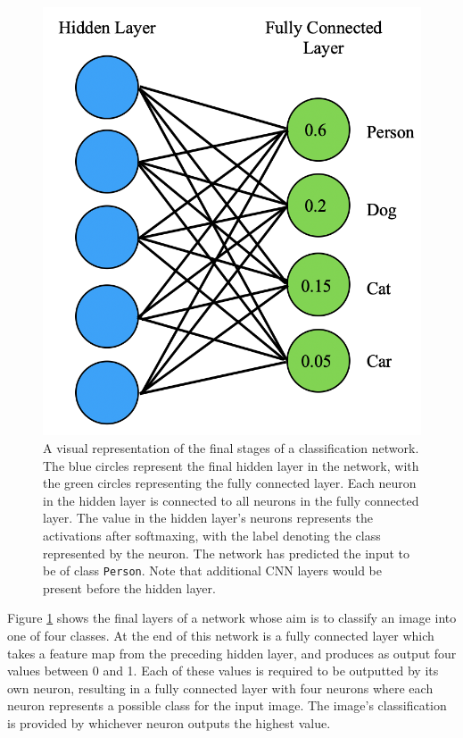 \begin{figure}[!hb]
	\begin{center}
		\includegraphics[scale=0.45]{Chapter2/figs/fully-connected.png}
	\end{center}
	\caption[A visual representation of the final stages of a classification network.]{A visual representation of the final stages of a classification network. The blue circles represent the final hidden layer in the network, with the green circles representing the fully connected layer. Each neuron in the hidden layer is connected to all neurons in the fully connected layer. The value in the hidden layer's neurons represents the activations after softmaxing, with the label denoting the class represented by the neuron. The network has predicted the input to be of class \texttt{Person}. Note that additional CNN layers would be present before the hidden layer.}
	\label{fig:fully-connected}
\end{figure}

Figure \ref{fig:fully-connected} shows the final layers of a network whose aim is to classify an image into one of four classes. At the end of this network is a fully connected layer which takes a feature map from the preceding hidden layer, and produces as output four values between 0 and 1. Each of these values is required to be outputted by its own neuron, resulting in a fully connected layer with four neurons where each neuron represents a possible class for the input image. The image's classification is provided by whichever neuron outputs the highest value. 

